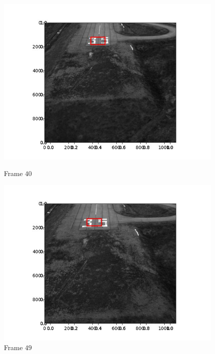 \begin{figure}[H]
\begin{minipage}{.49\textwidth}
    \includegraphics[width=\textwidth]{./figures/lk/landing/frame000040.jpg}
    \caption{Frame $40$}
  \end{minipage}
  \hfill
  \begin{minipage}{.49\textwidth}
    \centering
    \includegraphics[width=\textwidth]{./figures/lk/landing/frame000049.jpg}
    \caption{Frame $49$}
  \end{minipage}
\end{figure}


